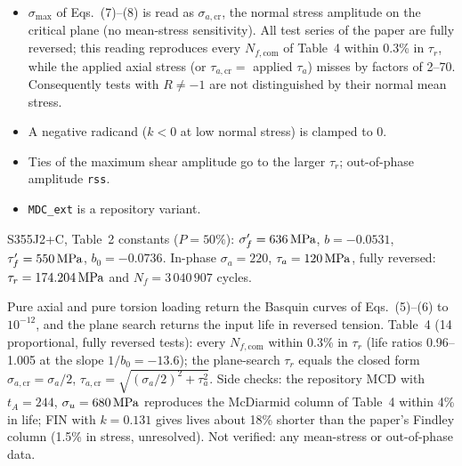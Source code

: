 \begin{itemize}
\item $\sigma_{\max}$ of Eqs.~(7)--(8) is read as $\sigma_{a,\mathrm{cr}}$, the normal stress amplitude
  on the critical plane (no mean-stress sensitivity). All test series of the paper are fully reversed;
  this reading reproduces every $N_{f,\mathrm{com}}$ of Table~4 within 0.3\% in $\tau_r$, while the
  applied axial stress (or $\tau_{a,\mathrm{cr}}=$ applied $\tau_a$) misses by factors of 2--70.
  Consequently tests with $R\neq-1$ are not distinguished by their normal mean stress.
\item A negative radicand ($k<0$ at low normal stress) is clamped to 0.
\item Ties of the maximum shear amplitude go to the larger $\tau_r$; out-of-phase amplitude
  \texttt{rss}.
\item \texttt{MDC\_ext} is a repository variant.
\end{itemize}

 S355J2+C, Table~2 constants ($P=50\%$): $\sigma_f'=636\,\mathrm{MPa}$, $b=-0.0531$,
$\tau_f'=550\,\mathrm{MPa}$, $b_0=-0.0736$. In-phase $\sigma_a=220$, $\tau_a=120\,\mathrm{MPa}$, fully reversed:
$\tau_r=174.204\,\mathrm{MPa}$ and $N_f=3\,040\,907$ cycles.

 Pure axial and pure torsion loading return the Basquin curves of Eqs.~(5)--(6)
to $10^{-12}$, and the plane search returns the input life in reversed tension. Table~4 (14
proportional, fully reversed tests): every $N_{f,\mathrm{com}}$ within 0.3\% in $\tau_r$ (life ratios
0.96--1.005 at the slope $1/b_0=-13.6$); the plane-search $\tau_r$ equals the closed form
$\sigma_{a,\mathrm{cr}}=\sigma_a/2$, $\tau_{a,\mathrm{cr}}=\sqrt{(\sigma_a/2)^2+\tau_a^2}$. Side
checks: the repository MCD with $t_A=244$, $\sigma_u=680\,\mathrm{MPa}$ reproduces the McDiarmid column of
Table~4 within 4\% in life; FIN with $k=0.131$ gives lives about 18\% shorter than the paper's Findley
column (1.5\% in stress, unresolved). Not verified: any mean-stress or out-of-phase data.
